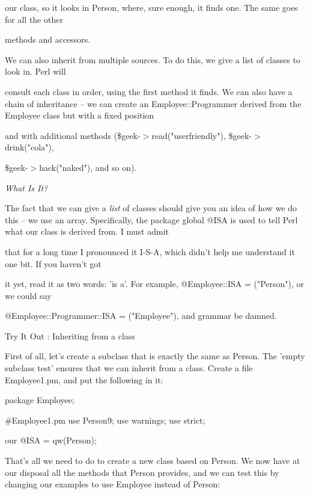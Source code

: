 \documentclass[a4paper,11pt]{book}
\begin{document}
\noindent our class, so it looks in Person, where, sure enough, it finds one. The same goes for all the other

\noindent methods and accessors.

\noindent 

\noindent We can also inherit from multiple sources. To do this, we give a list of classes to look in. Perl will

\noindent consult each class in order, using the first method it finds. We can also have a chain of inheritance -- we can create an Employee::Programmer derived from the Employee class but with a fixed position

\noindent and with additional methods (\$geek-$>$read("userfriendly"), \$geek-$>$drink("cola"),

\noindent \$geek-$>$hack("naked"), and so on).

\noindent 

\noindent \textit{What Is It?}

\noindent The fact that we can give a \textit{list }of classes should give you an idea of how we do this -- we use an array. Specifically, the package global @ISA is used to tell Perl what our class is derived from. I must admit

\noindent that for a long time I pronounced it I-S-A, which didn't help me understand it one bit. If you haven't got

\noindent it yet, read it as two words: 'is a'. For example, @Employee::ISA = ("Person"), or we could say

\noindent @Employee::Programmer::ISA = ("Employee"), and grammar be damned.

\noindent 

\noindent Try It Out : Inheriting from a class

\noindent First of all, let's create a subclass that is exactly the same as Person. The 'empty subclass test' ensures that we can inherit from a class. Create a file Employee1.pm, and put the following in it:

\noindent 

\noindent package Employee;

\noindent \#Employee1.pm use Person9; use warnings; use strict;

\noindent 

\noindent our @ISA = qw(Person);

\noindent 

\noindent That's all we need to do to create a new class based on Person. We now have at our disposal all the methods that Person provides, and we can test this by changing our examples to use Employee instead of Person:
\end{document}
